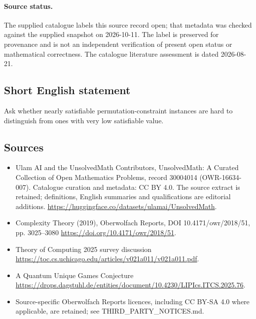 \documentclass[11pt]{article}
\begin{document}
\paragraph{Source status.}
The supplied catalogue labels this source record open; that metadata was checked against the supplied snapshot on 2026-10-11. The label is preserved for provenance and is not an independent verification of present open status or mathematical correctness. The catalogue literature assessment is dated 2026-08-21.
\subsection{Short English statement}
Ask whether nearly satisfiable permutation-constraint instances are hard to distinguish from ones with very low satisfiable value.
\subsection{Sources}
\begin{itemize}
\item[\hypertarget{source:30004014:1}{S1}] Ulam AI and the UnsolvedMath Contributors, UnsolvedMath: A Curated Collection of Open Mathematics Problems, record 30004014 (OWR-16634-007). Catalogue curation and metadata: CC BY 4.0. The source extract is retained; definitions, English summaries and qualifications are editorial additions.
\url{https://huggingface.co/datasets/ulamai/UnsolvedMath}.
\item[\hypertarget{source:30004014:2}{S2}] Complexity Theory (2019), Oberwolfach Reports, DOI 10.4171/owr/2018/51, pp. 3025--3080
\url{https://doi.org/10.4171/owr/2018/51}.
\item[\hypertarget{source:30004014:3}{S3}] Theory of Computing 2025 survey discussion
\url{https://toc.cs.uchicago.edu/articles/v021a011/v021a011.pdf}.
\item[\hypertarget{source:30004014:4}{S4}] A Quantum Unique Games Conjecture
\url{https://drops.dagstuhl.de/entities/document/10.4230/LIPIcs.ITCS.2025.76}.
\item Source-specific Oberwolfach Reports licences, including CC BY-SA 4.0 where applicable, are retained; see THIRD\_PARTY\_NOTICES.md.
\end{itemize}
\end{document}
